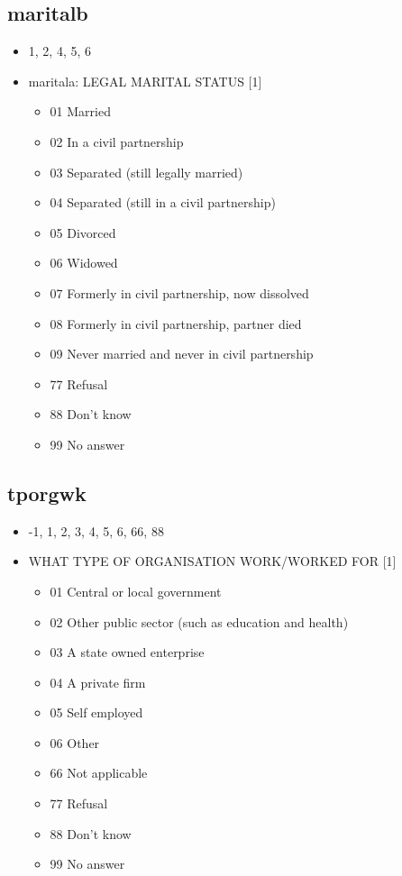 \documentclass[12pt]{article}
\begin{document}
\subsection{maritalb}
\begin{itemize}
\item 1, 2, 4, 5, 6
\item maritala: LEGAL MARITAL STATUS [1]
\begin{itemize}
\item 01 Married 
\item 02 In a civil partnership 
\item 03 Separated (still legally married) 
\item 04 Separated (still in a civil partnership) 
\item 05 Divorced 
\item 06 Widowed 
\item 07 Formerly in civil partnership, now dissolved 
\item 08 Formerly in civil partnership, partner died 
\item 09 Never married and never in civil partnership 
\item 77 Refusal 
\item 88 Don't know 
\item 99 No answer 
\end{itemize}
\end{itemize}

\subsection{tporgwk}
\begin{itemize}
\item -1, 1, 2, 3, 4, 5, 6, 66, 88
\item WHAT TYPE OF ORGANISATION WORK/WORKED FOR [1]
\begin{itemize}
\item 01 Central or local government 
\item 02 Other public sector (such as education and health) 
\item 03 A state owned enterprise 
\item 04 A private firm 
\item 05 Self employed 
\item 06 Other                                                  
\item 66 Not applicable 
\item 77 Refusal                                            
\item 88 Don’t know 
\item 99 No answer
\end{itemize}
\end{itemize}
\end{document}

